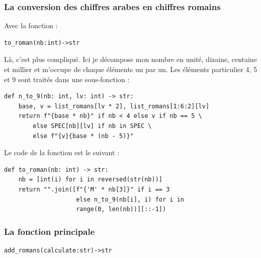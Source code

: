 \subsubsection*{La conversion des chiffres arabes en chiffres romains} 
Avec la fonction :
\begin{verbatim}
to_roman(nb:int)->str
\end{verbatim}
\medskip

Là, c'est plus compliqué. Ici je décompose mon nombre en unité, dizaine, centaine et millier et m'occupe de chaque éléments un par un. Les éléments particulier 4, 5 et 9 sont traités dans une sous-fonction :
\begin{lstlisting}
def n_to_9(nb: int, lv: int) -> str:
    base, v = list_romans[lv * 2], list_romans[1:6:2][lv]
    return f"{base * nb}" if nb < 4 else v if nb == 5 \
        else SPEC[nb][lv] if nb in SPEC \
        else f"{v}{base * (nb - 5)}"
\end{lstlisting}
\medskip

Le code de la fonction est le suivant :
\begin{lstlisting}
def to_roman(nb: int) -> str:
    nb = [int(i) for i in reversed(str(nb))]
    return "".join([f"{'M' * nb[3]}" if i == 3
                    else n_to_9(nb[i], i) for i in
                    range(0, len(nb))][::-1])
\end{lstlisting}
\medskip

\subsubsection*{La fonction principale}
\begin{verbatim}
add_romans(calculate:str)->str
\end{verbatim}
\medskip

